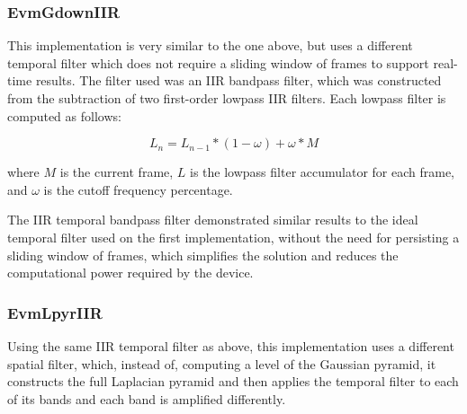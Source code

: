 \subsubsection{EvmGdownIIR} \label{sec:impl:evm:gdowniir}

This implementation is very similar to the one above, but uses a different
temporal filter which does not require a sliding window of frames to support
real-time results. The filter used was an IIR bandpass filter, which was
constructed from the subtraction of two first-order lowpass IIR filters. Each
lowpass filter is computed as follows:

\begin{equation}
  L_n = L_{n-1} * (1 - \omega) + \omega * M
\end{equation}

where $M$ is the current frame, $L$ is the lowpass filter accumulator for
each frame, and $\omega$ is the cutoff frequency percentage.

The IIR temporal bandpass filter demonstrated similar results to the ideal
temporal filter used on the first implementation, without the need for
persisting a sliding window of frames, which simplifies the solution and reduces
the computational power required by the device.

\subsubsection{EvmLpyrIIR} \label{sec:impl:evm:lpyriir}


Using the same IIR temporal filter as above, this implementation uses
a different spatial filter, which, instead of, computing a level of the
Gaussian pyramid, it constructs the full Laplacian pyramid and then applies
the temporal filter to each of its bands and each band is amplified differently.

